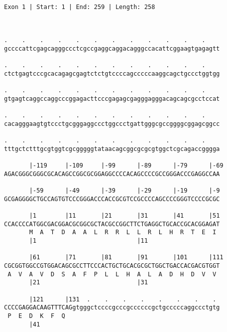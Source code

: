 \documentclass{article}
\begin{document}
 \begin{Verbatim}
 
Exon 1 | Start: 1 | End: 259 | Length: 258



.    .    .    .    .    .    .    .    .    .    .    .    
gccccattcgagcagggccctcgccgaggcaggacagggccacattcggaagtgagagtt
                                                            
.    .    .    .    .    .    .    .    .    .    .    .    
ctctgagtcccgcacagagcgagtctctgtccccagcccccaaggcagctgccctggtgg
                                                            
.    .    .    .    .    .    .    .    .    .    .    .    
gtgagtcaggccaggcccggagacttcccgagagcgagggagggacagcagcgcctccat
                                                            
.    .    .    .    .    .    .    .    .    .    .    .    
cacagggaagtgtccctgcgggaggccctggccctgattgggcgccggggcggagcggcc
                                                            
.    .    .    .    .    .    .    .    .    .    .    .    
tttgctctttgcgtggtcgcgggggtataacagcggcgcgcgtggctcgcagaccgggga
                                                            
       |-119     |-109     |-99      |-89      |-79      |-69
AGACGGGCGGGCGCACAGCCGGCGCGGAGGCCCCACAGCCCCGCCGGGACCCGAGGCCAA
                                                            
       |-59      |-49      |-39      |-29      |-19      |-9
GCGAGGGGCTGCCAGTGTCCCGGGACCCACCGCGTCCGCCCCAGCCCCGGGTCCCCGCGC
                                                            
       |1        |11       |21       |31       |41       |51
CCACCCCATGGCGACGGACGCGGCGCTACGCCGGCTTCTGAGGCTGCACCGCACGGAGAT
       M  A  T  D  A  A  L  R  R  L  L  R  L  H  R  T  E  I 
       |1                            |11                    
  
       |61       |71       |81       |91       |101      |111
CGCGGTGGCCGTGGACAGCGCCTTCCCACTGCTGCACGCGCTGGCTGACCACGACGTGGT
 A  V  A  V  D  S  A  F  P  L  L  H  A  L  A  D  H  D  V  V 
       |21                           |31                    
  
       |121      |131  .    .    .    .    .    .    .    . 
CCCCGAGGACAAGTTTCAGgtgggctccccgcccgccccccgctgcccccaggccctgtg
 P  E  D  K  F  Q                                           
       |41                                                  
  

\end{Verbatim}
\end{document}
